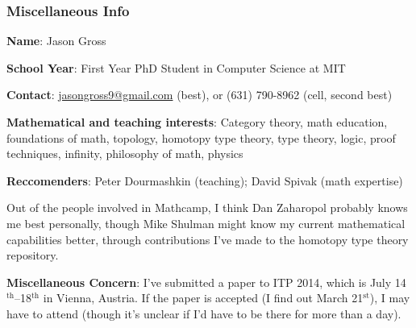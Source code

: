 \documentclass{article}
\begin{document}
\subsubsection*{Miscellaneous Info}
\noindent \textbf{Name}: Jason Gross \par
\noindent \textbf{School Year}: First Year PhD Student in Computer Science at MIT \par
\noindent \textbf{Contact}: \href{mailto:jasongross9@gmail.com}{jasongross9@gmail.com} (best), or %
(631) 790-8962%
\space (cell, second best) \par
\noindent \textbf{Mathematical and teaching interests}: Category theory, math education, foundations of math, topology, homotopy type theory, type theory, logic, proof techniques, infinity, philosophy of math, physics \par
\noindent \textbf{Reccomenders}: Peter Dourmashkin (teaching); David Spivak (math expertise) \par
\noindent Out of the people involved in Mathcamp, I think Dan Zaharopol probably knows me best personally, though Mike Shulman might know my current mathematical capabilities better, through contributions I've made to the homotopy type theory repository. \par
\noindent \textbf{Miscellaneous Concern}: I've submitted a paper to ITP 2014, which is July 14$^\text{th}$--18$^\text{th}$ in Vienna, Austria.  If the paper is accepted (I find out March 21$^\text{st}$), I may have to attend (though it's unclear if I'd have to be there for more than a day).
\end{document}
